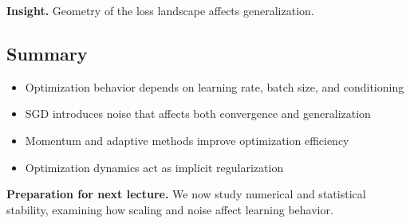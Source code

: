 \medskip

\noindent
\textbf{Insight.}  
Geometry of the loss landscape affects generalization.

\subsection{Summary}

\begin{itemize}
    \item Optimization behavior depends on learning rate, batch size, and conditioning
    \item SGD introduces noise that affects both convergence and generalization
    \item Momentum and adaptive methods improve optimization efficiency
    \item Optimization dynamics act as implicit regularization
\end{itemize}

\medskip

\noindent
\textbf{Preparation for next lecture.}  
We now study numerical and statistical stability, examining how scaling and noise affect learning behavior.